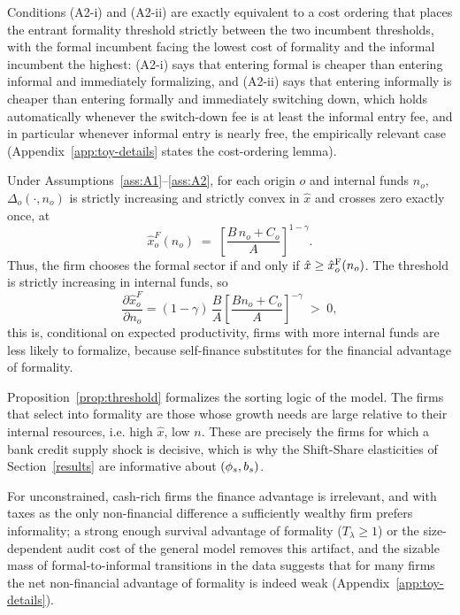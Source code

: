 \documentclass[12pt]{article}
\begin{document}
Conditions (A2-i) and (A2-ii) are exactly equivalent to a cost ordering that places the entrant formality threshold strictly between the two incumbent thresholds, with the formal incumbent facing the lowest cost of formality and the informal incumbent the highest: (A2-i) says that entering formal is cheaper than entering informal and immediately formalizing, and (A2-ii) says that entering informally is cheaper than entering formally and immediately switching down, which holds automatically whenever the switch-down fee is at least the informal entry fee, and in particular whenever informal entry is nearly free, the empirically relevant case (Appendix~\ref{app:toy-details} states the cost-ordering lemma).

\begin{proposition}
\label{prop:threshold}
Under Assumptions~\ref{ass:A1}--\ref{ass:A2}, for each origin $o$ and internal funds $n_{o}$, $\Delta_{o}(\cdot,n_{o})$ is strictly increasing and strictly convex in $\hat x$ and crosses zero exactly once, at
\begin{equation}
  \hat x^F_{o}(n_{o})
  \;=\;\left[\frac{B\,n_{o}+C_{o}}{A}\right]^{1-\gamma} .
  \label{eq:toy-threshold}
\end{equation}
Thus, the firm chooses the formal sector if and only if $\hat{x}\geq\hat{x}^{\mathrm{F}}_{o}(n_{o})$. The threshold is strictly increasing in internal funds, so
\begin{equation}
  \frac{\partial \hat x^F_{o}}{\partial n_{o}}
  = (1-\gamma)\,\frac{B}{A}
    \left[\frac{Bn_{o}+C_{o}}{A}\right]^{-\gamma} \;>\;0,
  \label{eq:toy-dthdn}
\end{equation}
this is, conditional on expected productivity, firms with more internal funds are less likely to formalize, because self-finance substitutes for the financial advantage of formality.
\end{proposition}
 
Proposition~\ref{prop:threshold} formalizes the sorting logic of the model. The firms that select into formality are those whose growth needs are large relative to their internal resources, i.e. high $\hat x$, low $n$. These are precisely the firms for which a bank credit supply shock is decisive, which is why the Shift-Share elasticities of Section~\ref{results} are informative about $(\phi_{s},b_{s})$.

For unconstrained, cash-rich firms the finance advantage is irrelevant, and with taxes as the only non-financial difference a sufficiently wealthy firm prefers informality; a strong enough survival advantage of formality ($T_\lambda \ge 1$) or the size-dependent audit cost of the general model removes this artifact, and the sizable mass of formal-to-informal transitions in the data suggests that for many firms the net non-financial advantage of formality is indeed weak (Appendix~\ref{app:toy-details}).
 
\end{document}
